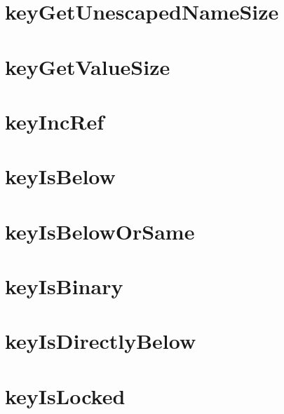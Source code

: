 \documentclass[twoside]{book}
\newcommand{\+}{\discretionary{\mbox{\scriptsize$\hookleftarrow$}}{}{}}
\begin{document}
\chapter{key\+Get\+Unescaped\+Name\+Size}
\label{doc_api_review_core_keyGetUnescapedNameSize_md}

\chapter{key\+Get\+Value\+Size}
\label{doc_api_review_core_keyGetValueSize_md}

\chapter{key\+Inc\+Ref}
\label{doc_api_review_core_keyIncRef_md}

\chapter{key\+Is\+Below}
\label{doc_api_review_core_keyIsBelow_md}

\chapter{key\+Is\+Below\+Or\+Same}
\label{doc_api_review_core_keyIsBelowOrSame_md}

\chapter{key\+Is\+Binary}
\label{doc_api_review_core_keyIsBinary_md}

\chapter{key\+Is\+Directly\+Below}
\label{doc_api_review_core_keyIsDirectlyBelow_md}

\chapter{key\+Is\+Locked}
\label{doc_api_review_core_keyIsLocked_md}

\end{document}
